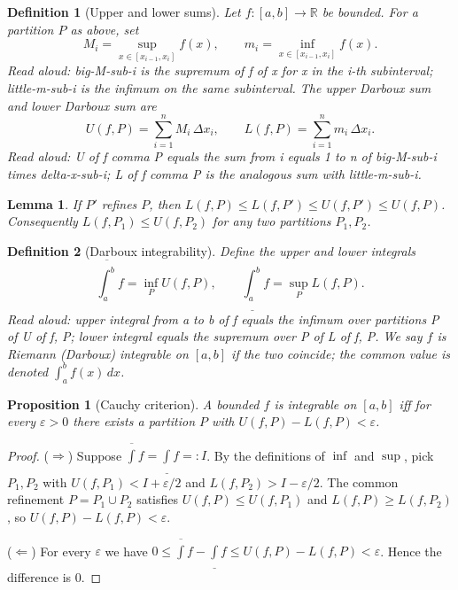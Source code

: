 \documentclass[11pt]{article}
\newtheorem{definition}{Definition}
\newtheorem{lemma}[theorem]{Lemma}
\newtheorem{proposition}[theorem]{Proposition}
\begin{document}
\begin{definition}[Upper and lower sums]
Let $f : [a,b] \to \mathbb{R}$ be bounded. For a partition $P$ as above, set
\[ M_i = \sup_{x \in [x_{i-1}, x_i]} f(x), \qquad m_i = \inf_{x \in [x_{i-1}, x_i]} f(x). \]
\emph{Read aloud:} big-M-sub-i is the supremum of f of x for x in the i-th subinterval; little-m-sub-i is the infimum on the same subinterval.
The \emph{upper Darboux sum} and \emph{lower Darboux sum} are
\[ U(f, P) = \sum_{i=1}^{n} M_i\, \Delta x_i, \qquad L(f, P) = \sum_{i=1}^{n} m_i\, \Delta x_i. \]
\emph{Read aloud:} U of f comma P equals the sum from i equals 1 to n of big-M-sub-i times delta-x-sub-i; L of f comma P is the analogous sum with little-m-sub-i.
\end{definition}

\begin{lemma}\label{lem:refine}
If $P'$ refines $P$, then $L(f, P) \le L(f, P') \le U(f, P') \le U(f, P)$.
Consequently $L(f, P_1) \le U(f, P_2)$ for any two partitions $P_1, P_2$.
\end{lemma}

\begin{definition}[Darboux integrability]
Define the \emph{upper} and \emph{lower integrals}
\[ \overline{\int_a^b} f = \inf_P U(f, P), \qquad \underline{\int_a^b} f = \sup_P L(f, P). \]
\emph{Read aloud:} upper integral from a to b of f equals the infimum over partitions P of U of f, P; lower integral equals the supremum over P of L of f, P.
We say $f$ is \emph{Riemann (Darboux) integrable} on $[a,b]$ if the two coincide; the
common value is denoted $\int_a^b f(x)\,dx$.
\end{definition}

\begin{proposition}[Cauchy criterion]\label{prop:cauchy}
A bounded $f$ is integrable on $[a,b]$ iff for every $\varepsilon > 0$ there exists a
partition $P$ with $U(f, P) - L(f, P) < \varepsilon$.
\end{proposition}

\begin{proof}
($\Rightarrow$) Suppose $\overline{\int} f = \underline{\int} f =: I$. By the
definitions of $\inf$ and $\sup$, pick $P_1, P_2$ with $U(f, P_1) < I + \varepsilon/2$
and $L(f, P_2) > I - \varepsilon/2$. The common refinement $P = P_1 \cup P_2$ satisfies
$U(f, P) \le U(f, P_1)$ and $L(f, P) \ge L(f, P_2)$, so $U(f,P) - L(f,P) < \varepsilon$.

($\Leftarrow$) For every $\varepsilon$ we have
$0 \le \overline{\int} f - \underline{\int} f \le U(f, P) - L(f, P) < \varepsilon$.
Hence the difference is $0$.
\end{proof}
\end{document}
